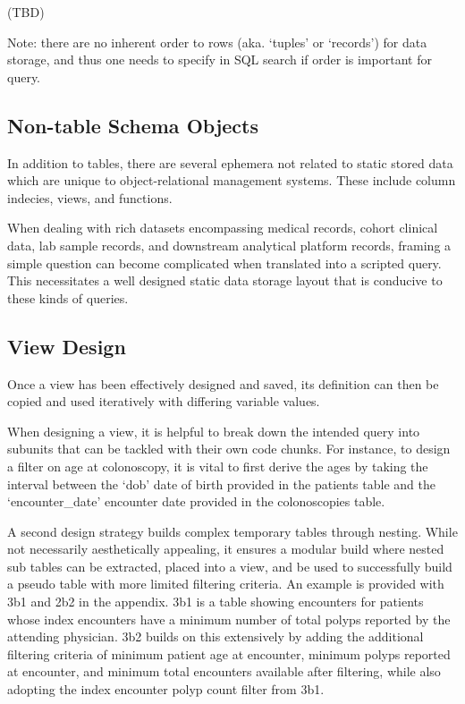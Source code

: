 \documentclass[]{article}
\begin{document}
(TBD)

Note: there are no inherent order to rows (aka. `tuples' or `records')
for data storage, and thus one needs to specify in SQL search if order
is important for query.

\subsection{Non-table Schema Objects}\label{non-table-schema-objects}

In addition to tables, there are several ephemera not related to static
stored data which are unique to object-relational management systems.
These include column indecies, views, and functions.

When dealing with rich datasets encompassing medical records, cohort
clinical data, lab sample records, and downstream analytical platform
records, framing a simple question can become complicated when
translated into a scripted query. This necessitates a well designed
static data storage layout that is conducive to these kinds of queries.

\subsection{View Design}\label{view-design}

Once a view has been effectively designed and saved, its definition can
then be copied and used iteratively with differing variable values.

When designing a view, it is helpful to break down the intended query
into subunits that can be tackled with their own code chunks. For
instance, to design a filter on age at colonoscopy, it is vital to first
derive the ages by taking the interval between the `dob' date of birth
provided in the patients table and the `encounter\_date' encounter date
provided in the colonoscopies table.

A second design strategy builds complex temporary tables through
nesting. While not necessarily aesthetically appealing, it ensures a
modular build where nested sub tables can be extracted, placed into a
view, and be used to successfully build a pseudo table with more limited
filtering criteria. An example is provided with 3b1 and 2b2 in the
appendix. 3b1 is a table showing encounters for patients whose index
encounters have a minimum number of total polyps reported by the
attending physician. 3b2 builds on this extensively by adding the
additional filtering criteria of minimum patient age at encounter,
minimum polyps reported at encounter, and minimum total encounters
available after filtering, while also adopting the index encounter polyp
count filter from 3b1.
\end{document}
